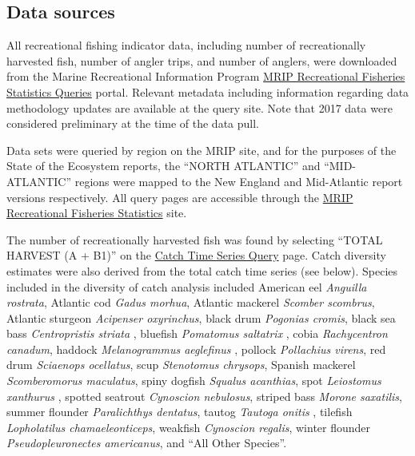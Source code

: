 \documentclass[
]{book}
\begin{document}
\hypertarget{data-sources-29}{%
\subsection{Data sources}\label{data-sources-29}}

All recreational fishing indicator data, including number of recreationally harvested fish, number of angler trips, and number of anglers, were downloaded from the Marine Recreational Information Program \href{https://www.st.nmfs.noaa.gov/recreational-fisheries/data-and-documentation/queries/index}{MRIP Recreational Fisheries Statistics Queries} portal. Relevant metadata including information regarding data methodology updates are available at the query site. Note that 2017 data were considered preliminary at the time of the data pull.

Data sets were queried by region on the MRIP site, and for the purposes of the State of the Ecosystem reports, the ``NORTH ATLANTIC'' and ``MID-ATLANTIC'' regions were mapped to the New England and Mid-Atlantic report versions respectively. All query pages are accessible through the \href{https://www.st.nmfs.noaa.gov/recreational-fisheries/data-and-documentation/queries/index}{MRIP Recreational Fisheries Statistics} site.

The number of recreationally harvested fish was found by selecting ``TOTAL HARVEST (A + B1)'' on the \href{https://www.st.nmfs.noaa.gov/recreational-fisheries/data-and-documentation/run-a-data-query}{Catch Time Series Query} page. Catch diversity estimates were also derived from the total catch time series (see below). Species included in the diversity of catch analysis included American eel \emph{Anguilla rostrata}, Atlantic cod \emph{Gadus morhua}, Atlantic mackerel \emph{Scomber scombrus}, Atlantic sturgeon \emph{Acipenser oxyrinchus}, black drum \emph{Pogonias cromis}, black sea bass \emph{Centropristis striata }, bluefish \emph{Pomatomus saltatrix }, cobia \emph{Rachycentron canadum}, haddock \emph{Melanogrammus aeglefinus} , pollock \emph{Pollachius virens}, red drum \emph{Sciaenops ocellatus}, scup \emph{Stenotomus chrysops}, Spanish mackerel \emph{Scomberomorus maculatus}, spiny dogfish \emph{Squalus acanthias}, spot \emph{Leiostomus xanthurus }, spotted seatrout \emph{Cynoscion nebulosus}, striped bass \emph{Morone saxatilis}, summer flounder \emph{Paralichthys dentatus}, tautog \emph{Tautoga onitis }, tilefish \emph{Lopholatilus chamaeleonticeps}, weakfish \emph{Cynoscion regalis}, winter flounder \emph{Pseudopleuronectes americanus}, and ``All Other Species''.
\end{document}

